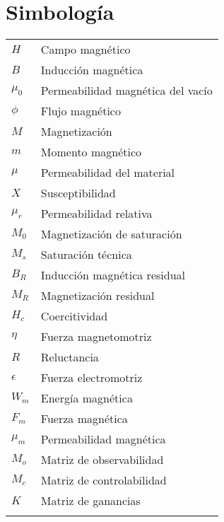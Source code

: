 \chapter{Simbolog\'ia}


\begin{tabular}{ll}
	$H$\hspace{3cm} & Campo magn\'etico \\
	$B$\hspace{3cm} & Inducci\'on magn\'etica\\
	$\mu_0$\hspace{3cm} & Permeabilidad magn\'etica del vac\'io \\
	$\phi$\hspace{3cm} & Flujo magn\'etico\\
	$M$\hspace{3cm} & Magnetizaci\'on\\
	$m$\hspace{3cm} & Momento magn\'etico\\
	$\mu$\hspace{3cm} & Permeabilidad del material\\ 
	$X$\hspace{3cm} & Susceptibilidad\\
	$\mu_r$\hspace{3cm} & Permeabilidad relativa\\
	$M_0$\hspace{3cm} & Magnetizaci\'on de saturaci\'on\\
	$M_s$\hspace{3cm} & Saturaci\'on t\'ecnica\\
	$B_R$\hspace{3cm} & Inducci\'on magn\'etica residual\\
	$M_R$\hspace{3cm} & Magnetizaci\'on residual\\
	$H_c$\hspace{3cm} & Coercitividad\\
	$\eta$\hspace{3cm} & Fuerza magnetomotriz\\
	$R$\hspace{3cm} & Reluctancia\\
	$\epsilon$\hspace{3cm} & Fuerza electromotriz\\
	$W_m$\hspace{3cm} & Energ\'ia magn\'etica\\
	$F_m$\hspace{3cm} & Fuerza magn\'etica \\
	$\mu_m$\hspace{3cm} & Permeabilidad magn\'etica\\	
	$M_o$\hspace{3cm} & Matriz de observabilidad\\
	$M_c$\hspace{3cm} & Matriz de controlabilidad\\
	$K$\hspace{3cm} & Matriz de ganancias\\
	
	\\
\end{tabular}

